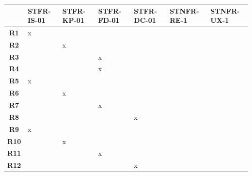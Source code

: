 \documentclass[12pt, titlepage]{article}
\begin{document}
\begin{table}[h!]
  \centering
  \begin{tabularx}{\textwidth}{|c|X|X|X|X|X|X|}
  \hline
  \textbf{}     & \textbf{STFR-IS-01} & \textbf{STFR-KP-01} & \textbf{STFR-FD-01} & \textbf{STFR-DC-01} & \textbf{STNFR-RE-1} & \textbf{STNFR-UX-1} \\ \hline
  \textbf{R1}   & x                   &                     &                     &                     &                     &                     \\ \hline
  \textbf{R2}   &                     & x                   &                     &                     &                     &                     \\ \hline
  \textbf{R3}   &                     &                     & x                   &                     &                     &                     \\ \hline
  \textbf{R4}   &                     &                     & x                   &                     &                     &                     \\ \hline
  \textbf{R5}   & x                   &                     &                     &                     &                     &                     \\ \hline
  \textbf{R6}   &                     & x                   &                     &                     &                     &                     \\ \hline
  \textbf{R7}   &                     &                     & x                   &                     &                     &                     \\ \hline
  \textbf{R8}   &                     &                     &                     & x                   &                     &                     \\ \hline
  \textbf{R9}   & x                   &                     &                     &                     &                     &                     \\ \hline
  \textbf{R10}  &                     & x                   &                     &                     &                     &                     \\ \hline
  \textbf{R11}  &                     &                     & x                   &                     &                     &                     \\ \hline
  \textbf{R12}  &                     &                     &                     & x                   &                     &                     \\ \hline

\end{tabularx}
\end{table}
\end{document}

